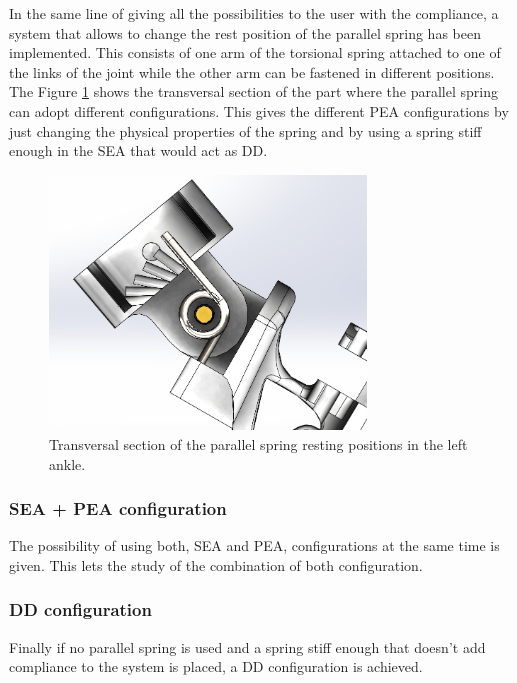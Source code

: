In the same line of giving all the possibilities to the user with the compliance, a system that allows to change the rest position of the parallel spring has been implemented.
This consists of one arm of the torsional spring attached to one of the links of the joint while the other arm can be fastened in different positions.
The Figure \ref{fig:rotational_spring_rest_position} shows the transversal section of the part where the parallel spring can adopt different configurations. 
This gives the different PEA configurations by just changing the physical properties of the spring and by using a spring stiff enough in the SEA that would act as DD.

\begin{figure}[ht!]
	\centering
	\includegraphics[width=0.75\textwidth]{figures/rotational_spring_rest_positions}
	\caption{Transversal section of the parallel spring resting positions in the left ankle.}
	\label{fig:rotational_spring_rest_position}
\end{figure}

\subsubsection{SEA + PEA configuration} %
\label{ssub:sea_pea_configuration}
The possibility of using both, SEA and PEA, configurations at the same time is given.
This lets the study of the combination of both configuration.

\subsubsection{DD configuration } %
\label{ssub:dd_configuration}
Finally if no parallel spring is used and a spring stiff enough that doesn't add compliance to the system is placed, a DD configuration is achieved.

